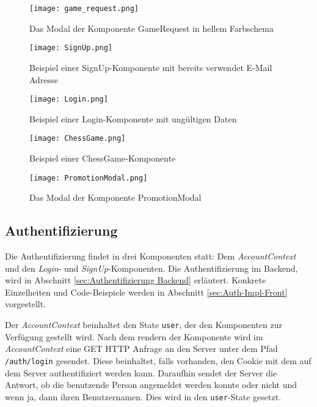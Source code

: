       \begin{figure}[htbp]
      \centering
  \texttt{[image: game\_request.png]}
  \caption{Das Modal der Komponente GameRequest in hellem Farbschema}
  \label{fig:game-request}
\end{figure}


      \begin{figure}[htbp]
      \centering
  \texttt{[image: SignUp.png]}
  \caption{Beispiel einer SignUp-Komponente mit bereits verwendet E-Mail Adresse} 
  \label{fig:SignUp}
\end{figure}

      \begin{figure}[htbp]
      \centering
  \texttt{[image: Login.png]}
  \caption{Beispiel einer Login-Komponente mit ungültigen Daten} 
  \label{fig:Login}
\end{figure}

      \begin{figure}[htbp]
      \centering
  \texttt{[image: ChessGame.png]}
  \caption{Beispiel einer ChessGame-Komponente} 
  \label{fig:chess-game}
\end{figure}
        
      \begin{figure}[htbp]
      \centering
  \texttt{[image: PromotionModal.png]}
  \caption{Das Modal der Komponente PromotionModal}
  \label{fig:PromotionModal}
\end{figure}
 


    
   
   \subsection{Authentifizierung}
   \label{sec:Autehtifizierung Frontend}
Die Authentifizierung findet in drei Komponenten statt: Dem \textit{AccountContext} und den \textit{Login}- und \textit{SignUp}-Komponenten. Die Authentifizierung im Backend, wird in Abschnitt \ref{sec:Authentifizierung Backend} erläutert. Konkrete Einzelheiten und Code-Beispiele werden in Abschnitt \ref{sec:Auth-Impl-Front} vorgestellt.

Der \textit{AccountContext} beinhaltet den State \verb|user|, der den Komponenten zur Verfügung gestellt wird.
Nach dem rendern der Komponente wird im \textit{AccountContext} eine GET HTTP Anfrage an den Server unter dem Pfad \verb|/auth/login| gesendet. Diese beinhaltet, falls vorhanden, den Cookie mit dem auf dem Server authentifiziert werden kann. Daraufhin sendet der Server die Antwort, ob die benutzende Person angemeldet werden konnte oder nicht und wenn ja, dann ihren Benutzernamen.
Dies wird in den \verb|user|-State gesetzt.


